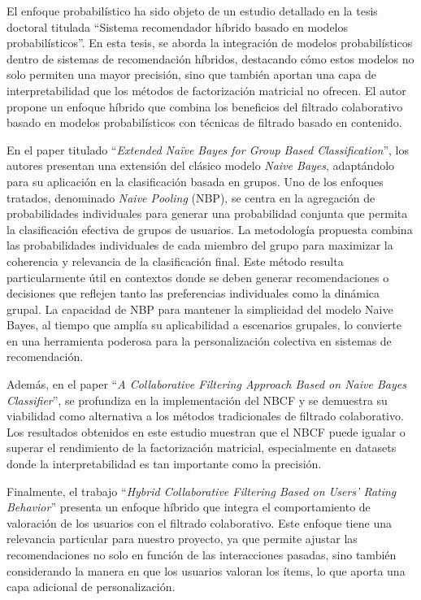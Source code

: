 \documentclass[runningheads,a4paper]{llncs}
\begin{document}
El enfoque probabilístico ha sido objeto de un 
estudio detallado en la tesis doctoral titulada 
``Sistema recomendador híbrido basado en modelos 
probabilísticos''\cite{tesis_sistema_recomendador_hibrido}. En esta tesis, se aborda la 
integración de modelos probabilísticos dentro de 
sistemas de recomendación híbridos, destacando cómo 
estos modelos no solo permiten una mayor precisión, 
sino que también aportan una capa de interpretabilidad 
que los métodos de factorización matricial no ofrecen. 
El autor propone un enfoque híbrido que combina los 
beneficios del filtrado colaborativo basado en modelos 
probabilísticos con técnicas de filtrado basado en 
contenido.

En el paper titulado ``\textit{Extended Naïve 
Bayes for Group Based Classification}''\cite{nbp}, los autores 
presentan una extensión del clásico modelo 
\textit{Naive Bayes}, adaptándolo para su aplicación 
en la clasificación basada en grupos. Uno de los 
enfoques tratados, 
denominado \textit{Naive Pooling} (NBP), se centra en la 
agregación de probabilidades individuales para 
generar una probabilidad conjunta que permita la 
clasificación efectiva de grupos de usuarios. La 
metodología propuesta combina las probabilidades 
individuales de cada miembro del grupo para maximizar 
la coherencia y relevancia de la clasificación final. 
Este método resulta particularmente útil en contextos 
donde se deben generar recomendaciones o decisiones 
que reflejen tanto las preferencias individuales 
como la dinámica grupal. La capacidad de NBP para 
mantener la simplicidad del modelo Naive Bayes, 
al tiempo que amplía su aplicabilidad a escenarios 
grupales, lo convierte en una herramienta poderosa 
para la personalización colectiva en sistemas de 
recomendación.

Además, en el paper ``\textit{A Collaborative Filtering 
Approach Based on Naive Bayes Classifier}''\cite{nbcf}, 
se profundiza en la implementación del NBCF y se 
demuestra su viabilidad como alternativa a los 
métodos tradicionales de filtrado colaborativo. 
Los resultados obtenidos en este estudio muestran 
que el NBCF puede igualar o superar el rendimiento de 
la factorización matricial, especialmente en datasets 
donde la interpretabilidad es tan importante como la 
precisión.

Finalmente, el trabajo ``\textit{Hybrid Collaborative Filtering 
Based on Users' Rating Behavior}''\cite{hybrid_collaborative_filtering} presenta un enfoque 
híbrido que integra el comportamiento de valoración 
de los usuarios con el filtrado colaborativo. 
Este enfoque tiene una relevancia particular para 
nuestro proyecto, ya que permite ajustar las 
recomendaciones no solo en función de las 
interacciones pasadas, sino también considerando la 
manera en que los usuarios valoran los ítems, lo que 
aporta una capa adicional de personalización.
\end{document}

